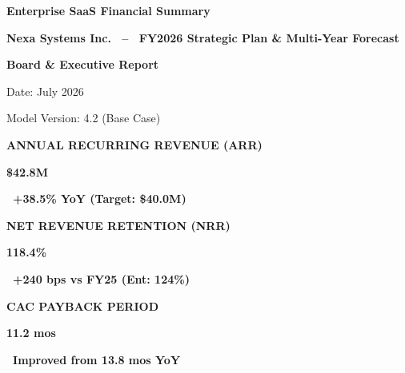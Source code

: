 \documentclass[10pt,a4paper]{article}
\newcommand{\kpival}[3]{%
  {\raggedright
  {\tiny\bfseries\color{MutedText}\uppercase{#1}}\par\vspace{2pt}
  {\Large\bfseries\color{NavyPrimary}#2}\par\vspace{2pt}
  {\small\bfseries#3}\par}%
}
\newcommand{\positivechange}[1]{\color{TealSuccess}\faArrowUp\ #1}
\begin{document}

\begin{tcolorbox}[enhanced, colback=NavyPrimary, colframe=NavyPrimary, arc=4pt, top=12pt, bottom=12pt, left=14pt, right=14pt]
  \begin{minipage}[c]{0.66\textwidth}
    \color{white}
    {\huge\bfseries Enterprise SaaS Financial Summary}\par\vspace{4pt}
    {\large\color{BlueAccent}\bfseries Nexa Systems Inc. \ -- \ FY2026 Strategic Plan \& Multi-Year Forecast}
  \end{minipage}%
  \hfill
  \begin{minipage}[c]{0.30\textwidth}
    \color{white}\raggedleft
    {\small\bfseries Board \& Executive Report}\par
    {\footnotesize\color{BorderColor} Date: July 2026}\par
    {\footnotesize\color{BorderColor} Model Version: 4.2 (Base Case)}
  \end{minipage}
\end{tcolorbox}

\vspace{6pt}

\noindent
\begin{minipage}[t]{0.31\textwidth}
  \begin{tcolorbox}[kpicard]
    \kpival{Annual Recurring Revenue (ARR)}{\$42.8M}{\positivechange{+38.5\% YoY (Target: \$40.0M)}}
  \end{tcolorbox}
\end{minipage}%
\hfill
\begin{minipage}[t]{0.31\textwidth}
  \begin{tcolorbox}[kpicard]
    \kpival{Net Revenue Retention (NRR)}{118.4\%}{\positivechange{+240 bps vs FY25 (Ent: 124\%)}}
  \end{tcolorbox}
\end{minipage}%
\hfill
\begin{minipage}[t]{0.31\textwidth}
  \begin{tcolorbox}[kpicard]
    \kpival{CAC Payback Period}{11.2 mos}{\positivechange{Improved from 13.8 mos YoY}}
  \end{tcolorbox}
\end{minipage}

\par\vspace{6pt}
\end{document}
